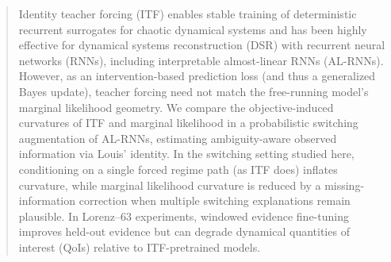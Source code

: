 \documentclass[twoside]{article}
\theoremstyle{plain}
\theoremstyle{definition}
\theoremstyle{remark}
\begin{document}


\begingroup
\renewcommand\thefootnote{}
\endgroup
\vspace{-0.8em}

\begin{abstract}
\vspace{-0.5em}
Identity teacher forcing (ITF) enables stable training of deterministic recurrent surrogates for chaotic dynamical systems and has been highly effective for dynamical systems reconstruction (DSR) with recurrent neural networks (RNNs), including interpretable almost-linear RNNs (AL-RNNs). However, as an intervention-based prediction loss (and thus a generalized Bayes update), teacher forcing need not match the free-running model’s marginal likelihood geometry. We compare the objective-induced curvatures of ITF and marginal likelihood in a probabilistic switching augmentation of AL-RNNs, estimating ambiguity-aware observed information via Louis’ identity. In the switching setting studied here, conditioning on a single forced regime path (as ITF does) inflates curvature, while marginal likelihood curvature is reduced by a missing-information correction when multiple switching explanations remain plausible. In Lorenz--63 experiments, windowed evidence fine-tuning improves held-out evidence but can degrade dynamical quantities of interest (QoIs) relative to ITF-pretrained models.
\end{abstract}
\vspace{-0.5em}
\end{document}
